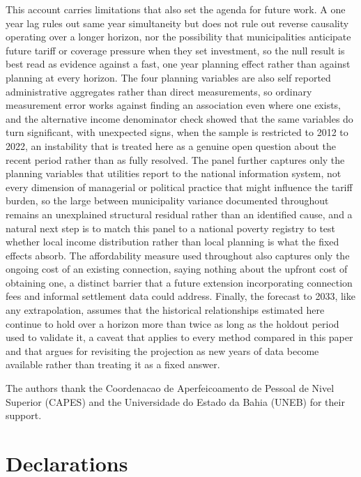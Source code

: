 \documentclass[pdflatex,sn-mathphys-num]{sn-jnl}%
\theoremstyle{thmstyleone}%
\theoremstyle{thmstyletwo}%
\theoremstyle{thmstylethree}%
\begin{document}
This account carries limitations that also set the agenda for future work. A one year lag rules out same year simultaneity but does not rule out reverse causality operating over a longer horizon, nor the possibility that municipalities anticipate future tariff or coverage pressure when they set investment, so the null result is best read as evidence against a fast, one year planning effect rather than against planning at every horizon. The four planning variables are also self reported administrative aggregates rather than direct measurements, so ordinary measurement error works against finding an association even where one exists, and the alternative income denominator check showed that the same variables do turn significant, with unexpected signs, when the sample is restricted to 2012 to 2022, an instability that is treated here as a genuine open question about the recent period rather than as fully resolved. The panel further captures only the planning variables that utilities report to the national information system, not every dimension of managerial or political practice that might influence the tariff burden, so the large between municipality variance documented throughout remains an unexplained structural residual rather than an identified cause, and a natural next step is to match this panel to a national poverty registry to test whether local income distribution rather than local planning is what the fixed effects absorb. The affordability measure used throughout also captures only the ongoing cost of an existing connection, saying nothing about the upfront cost of obtaining one, a distinct barrier that a future extension incorporating connection fees and informal settlement data could address. Finally, the forecast to 2033, like any extrapolation, assumes that the historical relationships estimated here continue to hold over a horizon more than twice as long as the holdout period used to validate it, a caveat that applies to every method compared in this paper and that argues for revisiting the projection as new years of data become available rather than treating it as a fixed answer.

\backmatter


The authors thank the Coordenacao de Aperfeicoamento de Pessoal de Nivel Superior (CAPES) and the Universidade do Estado da Bahia (UNEB) for their support.

\section*{Declarations}
\end{document}
